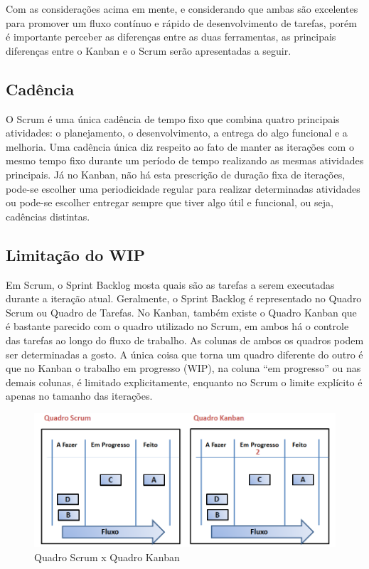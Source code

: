 Com as considerações acima em mente, e considerando que ambas são excelentes para promover um fluxo contínuo e rápido de desenvolvimento de tarefas, porém é importante perceber as diferenças entre as duas ferramentas, as principais diferenças entre o Kanban e o Scrum serão apresentadas a seguir.

\subsection[Cadência]{Cadência}

O Scrum é uma única cadência de tempo fixo que combina quatro principais atividades: o planejamento, o desenvolvimento, a entrega do algo funcional e a melhoria. Uma cadência única diz respeito ao fato de manter as iterações com o mesmo tempo fixo durante um período de tempo realizando as mesmas atividades principais. Já no Kanban, não há esta prescrição de duração fixa de iterações, pode-se escolher uma periodicidade regular para realizar determinadas atividades ou pode-se escolher entregar sempre que tiver algo útil e funcional, ou seja, cadências distintas. 

\subsection[Limitação do WIP]{Limitação do WIP}

Em Scrum, o Sprint Backlog mosta quais são as tarefas a serem executadas durante a iteração atual. Geralmente, o Sprint Backlog é representado no Quadro Scrum ou Quadro de Tarefas. No Kanban, também existe o Quadro Kanban que é bastante parecido com o quadro utilizado no Scrum, em ambos há o controle das tarefas ao longo do fluxo de trabalho. As colunas de ambos os quadros podem ser determinadas a gosto. A única coisa que torna um quadro diferente do outro é que no Kanban o trabalho em progresso (WIP), na coluna “em progresso” ou nas demais colunas, é limitado explicitamente, enquanto no Scrum o limite explícito é apenas no tamanho das iterações. 

\begin{figure}[h]
		\centering
		\label{fig03}
			\includegraphics[scale=0.7]{figuras/quadros.png}
		\caption{Quadro Scrum x Quadro Kanban}
\end{figure}

